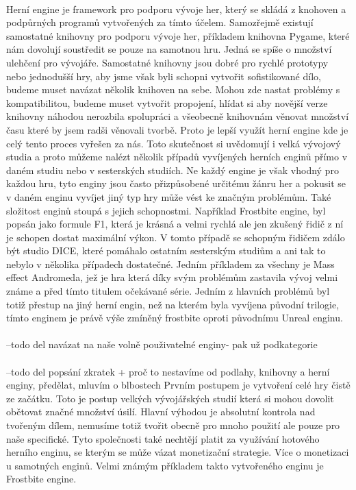 \paragraph{}
	Herní engine je framework pro podporu vývoje her, který se skládá z knohoven a podpůrných programů vytvořených za tímto účelem.
	Samozřejmě existují samostatné knihovny pro podporu vývoje her, příkladem knihovna Pygame\cite{pygame}, které nám dovolují soustředit se pouze na samotnou hru.
	Jedná se spíše o množství ulehčení pro vývojáře.
	Samostatné knihovny jsou dobré pro rychlé prototypy nebo jednodušší hry, aby jsme však byli schopni vytvořit sofistikované dílo, budeme muset navázat několik knihoven na sebe.
	Mohou zde nastat problémy s kompatibilitou, budeme muset vytvořit propojení, hlídat si aby novější verze knihovny náhodou nerozbila spolupráci a všeobecně knihovnám věnovat množství času které by jsem radši věnovali tvorbě.
	Proto je lepší využít herní engine kde je celý tento proces vyřešen za nás.
	Toto skutečnost si uvědomují i velká vývojový studia a proto můžeme nalézt několik případů vyvíjených herních enginů přímo v daném studiu nebo v sesterských studiích.
	Ne každý engine je však vhodný pro každou hru, tyto enginy jsou často přizpůsobené určitému žánru her a pokusit se v daném enginu vyvíjet jiný typ hry může vést ke značným problémům.
	Také složitost enginů stoupá s jejich schopnostmi.
	Například Frostbite engine\cite{frostbite}, byl popsán jako formule F1, která je krásná a velmi rychlá ale jen zkušený řidič z ní je schopen dostat maximální výkon\cite{frostbite_article}.
	V tomto případě se schopným řidičem zdálo být studio DICE, které pomáhalo ostatním sesterským studiům a ani tak to nebylo v několika případech dostatečné.
	Jedním příkladem za všechny je Mass effect Andromeda\cite{mass_effect_andromeda}, jež je hra která díky svým problémům zastavila vývoj velmi známe a před tímto titulem očekávané série.
	Jedním z hlavních problémů byl totiž přestup na jiný herní engin, než na kterém byla vyvíjena původní trilogie, tímto enginem je právě výše zmíněný frostbite oproti původnímu Unreal enginu\cite{unreal_engine}.

\paragraph{} --todo del navázat na naše volně použivatelné enginy- pak už podkategorie


\paragraph{}--todo del popsání zkratek + proč to nestavíme od podlahy, knihovny a herní enginy, předělat, mluvím o blbostech
	Prvním postupem je vytvoření celé hry čistě ze začátku.
	Toto je postup velkých vývojářských studií která si mohou dovolit obětovat značné množství úsilí.
	Hlavní výhodou je absolutní kontrola nad tvořeným dílem, nemusíme totiž tvořit obecně pro mnoho použití ale pouze pro naše specifické.
	Tyto společnosti také nechtějí platit za využívání  hotového herního enginu, se kterým se může vázat monetizační strategie.
	Více o monetizaci u samotných enginů.
	Velmi známým příkladem takto vytvořeného enginu je Frostbite engine\cite{frostbite}.

